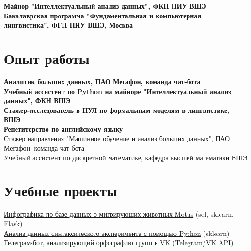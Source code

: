 \documentclass[11pt]{article} %
\begin{document}
\textbf{Майнор "Интеллектуальный анализ данных", ФКН НИУ ВШЭ}\\
\textbf{Бакалаврская программа "Фундаментальная и компьютерная лингвистика", ФГН НИУ ВШЭ, Москва}


\section*{Опыт работы}

 \textbf{Аналитик больших данных, ПАО Мегафон, команда чат-бота}\\
 \textbf{Учебный ассистент по Python на майноре "Интеллектуальный анализ данных", ФКН ВШЭ}\\
 \textbf{Стажер-исследователь в НУЛ по формальным моделям в лингвистике, ВШЭ}\\
 \textbf{Репетиторство по английскому языку}\\
 {Стажер направления "Машинное обучение и анализ больших данных", ПАО Мегафон, команда чат-бота}\\
Учебный ассистент по дискретной математике, кафедра высшей математики ВШЭ




\section*{Учебные проекты}

\href{https://github.com/thddbptnsndshs/motustoday}{Инфографика по базе данных о мигрирующих животных Motus} (sql, sklearn, Flask)\\
\href{https://github.com/thddbptnsndshs/idioms}{Анализ данных синтаксического эксперимента с помощью Python} (sklearn)\\
\href{https://github.com/thddbptnsndshs/nlzlkskprdstvtljsclnhgrppncnvfrmvgrppvk}{Телеграм-бот, анализирующий орфографию групп в VK} (Telegram/VK API)\\
\end{document}
